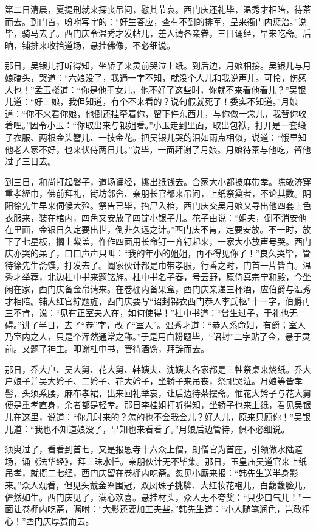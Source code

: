第二日清晨，夏提刑就来探丧吊问，慰其节哀。西门庆还礼毕，温秀才相陪，待茶而去。到门首，吩咐写字的：“好生答应，查有不到的排军，呈来衙门内惩治。”说毕，骑马去了。西门庆令温秀才发帖儿，差人请各亲眷，三日诵经，早来吃斋。后晌，铺排来收拾道场，悬挂佛像，不必细说。

那日，吴银儿打听得知，坐轿子来灵前哭泣上纸。到后边，月娘相接。吴银儿与月娘磕头，哭道：“六娘没了，我通一字不知，就没个人儿和我说声儿。可怜，伤感人也！”孟玉楼道：“你是他干女儿，他不好了这些时，你就不来看他看儿？”吴银儿道：“好三娘，我但知道，有个不来看的？说句假就死了！委实不知道。”月娘道：“你不来看你娘，他倒还挂牵着你，留下件东西儿，与你做一念儿，我替你收着哩。”因令小玉：“你取出来与银姐看。”小玉走到里面，取出包袱，打开是一套缎子衣服、两根金头簪儿、一技金花。把吴银儿哭的泪如雨点相似，说道：“饿早知他老人家不好，也来伏侍两日儿。”说毕，一面拜谢了月娘。月娘待茶与他吃，留他过了三日去。

到三日，和尚打起磐子，道场诵经，挑出纸钱去。合家大小都披麻带孝。陈敬济穿重孝絰巾，佛前拜礼，街坊邻舍、亲朋长官都来吊问，上纸祭奠者，不论其数。阴阳徐先生早来伺候大殓。祭告已毕，抬尸入棺，西门庆交吴月娘又寻出他四套上色衣服来，装在棺内，四角又安放了四锭小银子儿。花子由说：“姐夫，倒不消安他在里面，金银日久定要出世，倒非久远之计。”西门庆不肯，定要安放。不一时，放下了七星板，搁上紫盖，仵作四面用长命钉一齐钉起来，一家大小放声号哭。西门庆亦哭的呆了，口口声声只叫：“我的年小的姐姐，再不得见你了！”良久哭毕，管待徐先生斋馔，打发去了。阖家伙计都是巾带孝服，行香之时，门首一片皆白。温秀才举荐，北边杜中书来题铭旌。杜中书名子春，号云野，原侍真宗宁和殿，今坐闲在家，西门庆备金帛请来。在卷棚内备果盒，西门庆亲递三杯酒，应伯爵与温秀才相陪。铺大红官紵题旌，西门庆要写“诏封锦衣西门恭人李氏柩”十一字，伯爵再三不肯，说：“见有正室夫人在，如何使得！”杜中书道：“曾生过子，于礼也无碍。”讲了半日，去了“恭”字，改了“室人”。温秀才道：“恭人系命妇，有爵；室人乃室内之人，只是个浑然通常之称。”于是用白粉题毕，“诏封”二字贴了金，悬于灵前。又题了神主。叩谢杜中书，管待酒馔，拜辞而去。

那日，乔大户、吴大舅、花大舅、韩姨夫、沈姨夫各家都是三牲祭桌来烧纸。乔大户娘子并吴大妗子、二妗子、花大妗子，坐轿子来吊丧，祭祀哭泣。月娘等皆孝髻，头须系腰，麻布孝裙，出来回礼举哀，让后边待茶摆斋。惟花大妗子与花大舅便是重孝直身，余者都是轻孝。那日李桂姐打听得知，坐轿子也来上纸，看见吴银儿在这里，说道：“你几时来的？怎的也不会我会儿？好人儿，原来只顾你！”吴银儿道：“我也不知道娘没了，早知也来看看了。”月娘后边管待，俱不必细说。

须臾过了，看看到首七，又是报恩寺十六众上僧，朗僧官为首座，引领做水陆道场，诵《法华经》，拜三昧水忏。亲朋伙计无不毕集。那日，玉皇庙吴道官来上纸吊孝，就揽二七经，西门庆留在卷棚内吃斋。忽见小厮来报：“韩先生送半身影来。”众人观看，但见头戴金翠围冠，双凤珠子挑牌、大红妆花袍儿，白馥馥脸儿，俨然如生。西门庆见了，满心欢喜。悬挂材头，众人无不夸奖：“只少口气儿！”一面让卷棚内吃斋，嘱咐：“大影还要加工夫些。”韩先生道：“小人随笔润色，岂敢粗心！”西门庆厚赏而去。

